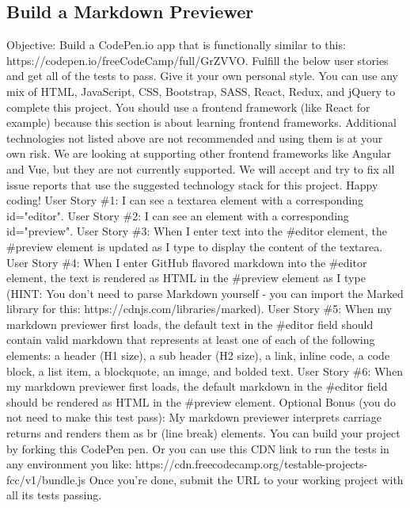 \documentclass{article}%
\begin{document}
\subsection{Build a Markdown Previewer}%
\label{subsec:BuildaMarkdownPreviewer}%
Objective: Build a CodePen.io app that is functionally similar to this: https://codepen.io/freeCodeCamp/full/GrZVVO.\newline%
Fulfill the below user stories and get all of the tests to pass. Give it your own personal style.\newline%
You can use any mix of HTML, JavaScript, CSS, Bootstrap, SASS, React, Redux, and jQuery to complete this project. You should use a frontend framework (like React for example) because this section is about learning frontend frameworks. Additional technologies not listed above are not recommended and using them is at your own risk. We are looking at supporting other frontend frameworks like Angular and Vue, but they are not currently supported. We will accept and try to fix all issue reports that use the suggested technology stack for this project. Happy coding!\newline%
User Story \#1: I can see a textarea element with a corresponding id="editor".\newline%
User Story \#2: I can see an element with a corresponding id="preview".\newline%
User Story \#3: When I enter text into the \#editor element, the \#preview element is updated as I type to display the content of the textarea.\newline%
User Story \#4: When I enter GitHub flavored markdown into the \#editor element, the text is rendered as HTML in the \#preview element as I type (HINT: You don't need to parse Markdown yourself {-} you can import the Marked library for this: https://cdnjs.com/libraries/marked).\newline%
User Story \#5: When my markdown previewer first loads, the default text in the \#editor field should contain valid markdown that represents at least one of each of the following elements: a header (H1 size), a sub header (H2 size), a link, inline code, a code block, a list item, a blockquote, an image, and bolded text.\newline%
User Story \#6: When my markdown previewer first loads, the default markdown in the \#editor field should be rendered as HTML in the \#preview element.\newline%
Optional Bonus (you do not need to make this test pass): My markdown previewer interprets carriage returns and renders them as br (line break) elements.\newline%
You can build your project by forking this CodePen pen. Or you can use this CDN link to run the tests in any environment you like: https://cdn.freecodecamp.org/testable{-}projects{-}fcc/v1/bundle.js\newline%
Once you're done, submit the URL to your working project with all its tests passing.\newline%
\end{document}
